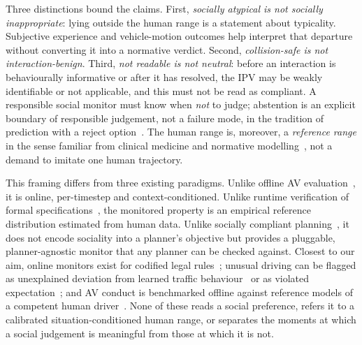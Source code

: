\documentclass[12pt,a4paper]{article}
\begin{document}
Three distinctions bound the claims. First, \emph{socially atypical is not socially inappropriate}:
lying outside the human range is a statement about typicality. Subjective experience and
vehicle-motion outcomes help interpret that departure without converting it into a normative
verdict. Second, \emph{collision-safe is not interaction-benign}. Third, \emph{not readable is not neutral}: before
an interaction is behaviourally informative or after it has resolved, the IPV may be weakly
identifiable or not applicable, and this must not be read as compliant. A responsible social
monitor must know when \emph{not} to judge; abstention is an explicit boundary of responsible
judgement, not a failure mode, in the tradition of prediction with a reject
option~\cite{chow1970optimum, cortes2016learning, geifman2017selective}. The human range is, moreover,
a \emph{reference range} in the sense familiar from clinical medicine and normative
modelling~\cite{ozarda2016reference, marquand2016understanding, bethlehem2022brain}, not a demand to
imitate one human trajectory.

This framing differs from three existing paradigms. Unlike offline AV
evaluation~\cite{caesar2021nuplan, montali2023waymo}, it is online, per-timestep and
context-conditioned. Unlike runtime verification of formal
specifications~\cite{leucker2009brief, maler2004monitoring, sha2001using, lindemann2023conformal}, the
monitored property is an empirical reference distribution estimated from human data. Unlike socially
compliant planning~\cite{schwarting2019social, sun2018courteous, sadigh2016planning, kruse2013human,
mavrogiannis2023core}, it does not encode sociality into a planner's objective but provides a
pluggable, planner-agnostic monitor that any planner can be checked against. Closest to our aim,
online monitors exist for codified legal rules~\cite{yu2024online}; unusual driving can be flagged as
unexplained deviation from learned traffic behaviour~\cite{hu2023socially} or as violated
expectation~\cite{dinparastdjadid2023measuring, engstrom2024modeling}; and AV conduct is benchmarked
offline against reference models of a competent human driver~\cite{scanlon2026collision,
schumann2026active}. None of these reads a social preference, refers it to a calibrated
situation-conditioned human range, or separates the moments at which a social judgement is meaningful
from those at which it is not.
\end{document}
